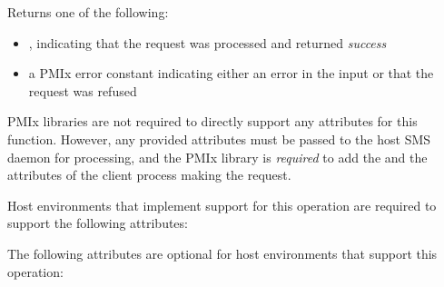 \begin{arglist}
\end{arglist}

Returns one of the following:

\begin{itemize}
    \item {}, indicating that the request was processed and returned \textit{success}
    \item a PMIx error constant indicating either an error in the input or that the request was refused
\end{itemize}

\reqattrstart
\ac{PMIx} libraries are not required to directly support any attributes for this function. However, any provided attributes must be passed to the host \ac{SMS} daemon for processing, and the \ac{PMIx} library is \textit{required} to add the  and the  attributes of the client process making the request.

\divider

Host environments that implement support for this operation are required to support the following attributes:


\reqattrend

\optattrstart
The following attributes are optional for host environments that support this operation:


\optattrend

\descr

